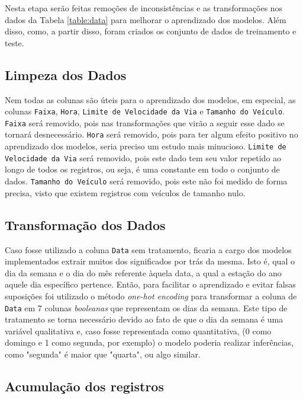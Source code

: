 Nesta etapa serão feitas remoções de inconsistências e as transformações nos dados da Tabela \ref{table:data} para melhorar o aprendizado dos modelos. Além disso, como, a partir disso, foram criados os conjunto de dados de treinamento e teste.

\subsection{Limpeza dos Dados}

Nem todas as colunas são úteis para o aprendizado dos modelos, em especial, as colunas \texttt{Faixa}, \texttt{Hora}, \texttt{Limite de Velocidade da Via} e \texttt{Tamanho do Veículo}. \texttt{Faixa} será removido, pois nas transformações que virão a seguir esse dado se tornará desnecessário. \texttt{Hora} será removido, pois para ter algum efeito positivo no aprendizado dos modelos, seria preciso um estudo mais minucioso. \texttt{Limite de Velocidade da Via} será removido, pois este dado tem seu valor repetido ao longo de todos os registros, ou seja, é uma constante em todo o conjunto de dados. \texttt{Tamanho do Veículo} será removido, pois este não foi medido de forma precisa, visto que existem registros com veículos de tamanho nulo.

\subsection{Transformação dos Dados}

Caso fosse utilizado a coluna \texttt{Data} sem tratamento, ficaria a cargo dos modelos implementados extrair muitos dos significados por trás da mesma. Isto é, qual o dia da semana e o dia do mês referente àquela data, a qual a estação do ano aquele dia específico pertence. Então, para facilitar o aprendizado e evitar falsas suposições foi utilizado o método \textit{one-hot encoding} para transformar a coluna de \texttt{Data} em 7 colunas \textit{booleanas} que representam os dias da semana. Este tipo de tratamento se torna necessário devido ao fato de que o dia da semana é uma variável qualitativa e, caso fosse representada como quantitativa, (0 como domingo e 1 como segunda, por exemplo) o modelo poderia realizar inferências, como "segunda" é maior que "quarta", ou algo similar.

\subsection{Acumulação dos registros}

